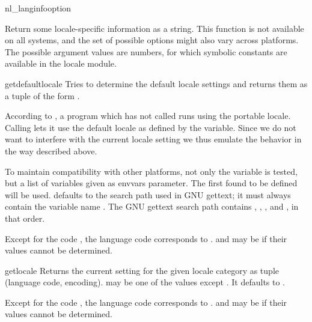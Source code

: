 \begin{funcdesc}{nl_langinfo}{option}

Return some locale-specific information as a string. This function is
not available on all systems, and the set of possible options might
also vary across platforms. The possible argument values are numbers,
for which symbolic constants are available in the locale module.

\end{funcdesc}

\begin{funcdesc}{getdefaultlocale}{}
  Tries to determine the default locale settings and returns
  them as a tuple of the form .

  According to \POSIX, a program which has not called
   runs using the portable 
  locale.  Calling  lets it use the
  default locale as defined by the  variable.  Since we
  do not want to interfere with the current locale setting we thus
  emulate the behavior in the way described above.

  To maintain compatibility with other platforms, not only the
   variable is tested, but a list of variables given as
  envvars parameter.  The first found to be defined will be
  used.   defaults to the search path used in GNU gettext;
  it must always contain the variable name .  The GNU
  gettext search path contains , ,
  , and , in that order.

  Except for the code , the language code corresponds to
  .   and  may be
   if their values cannot be determined.
\end{funcdesc}

\begin{funcdesc}{getlocale}{}
  Returns the current setting for the given locale category as
  tuple (language code, encoding).   may be one of the
   values except .  It defaults to
  .

  Except for the code , the language code corresponds to
  .   and  may be
   if their values cannot be determined.
\end{funcdesc}

